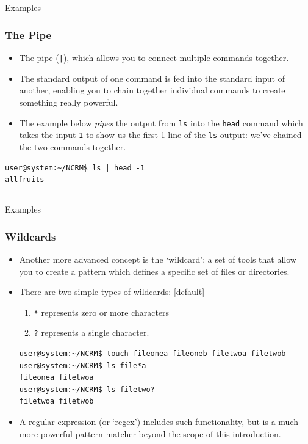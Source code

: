 \documentclass[10pt]{beamer}
\begin{document}
\subsection{}
\begin{frame}[fragile]{Examples}
\frametitle{The Pipe}
\begin{itemize}
\item The pipe (\texttt{|}), which allows you to connect multiple commands together.\vspace{0.1in}
\item The standard output of one command is fed into the standard input of another, enabling you to chain together individual commands to create something really powerful.\vspace{0.1in}
\item The example below \emph{pipes} the output from \texttt{ls} into the \texttt{head} command which takes the input \texttt{1} to show us the first 1 line of the \texttt{ls} output: we've chained the two commands together.
\end{itemize}
\begin{lstlisting}[style=BashInputStyle, title=The Pipe \texttt{(|)}]
user@system:~/NCRM$ ls | head -1
allfruits
\end{lstlisting}
\end{frame}

\subsection{}
\begin{frame}[fragile]{Examples}
\frametitle{Wildcards}
\begin{itemize}
\item Another more advanced concept is the `wildcard': a set of tools that allow you to create a pattern which defines a specific set of files or directories.\vspace{0.1in}
\item There are two simple types of wildcards: 
[default]
\begin{enumerate}
\item \texttt{*} represents zero or more characters
\item \texttt{?} represents a single character.
\end{enumerate}
\begin{lstlisting}[style=BashInputStyle, title=Wildcards: \texttt{*} and \texttt{?}]
user@system:~/NCRM$ touch fileonea fileoneb filetwoa filetwob
user@system:~/NCRM$ ls file*a
fileonea filetwoa
user@system:~/NCRM$ ls filetwo?
filetwoa filetwob
\end{lstlisting}
\item A regular expression (or `regex') includes such functionality, but is a much more powerful pattern matcher beyond the scope of this introduction.
\end{itemize}
\end{frame}
\end{document}
